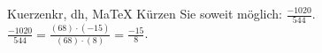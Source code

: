 \begin{MAufgabe}{Kuerzen}{kr, dh, MaTeX}
K\"urzen Sie soweit m\"oglich: $\frac{-1020}{544}$.\\ 
\ifLsg\MLoesung
\quad $\frac{-1020}{544}=\frac{(68)\cdot(-15)}{(68)\cdot(8)}=\frac{-15}{8}$.\else\relax\fi
 \end{MAufgabe}